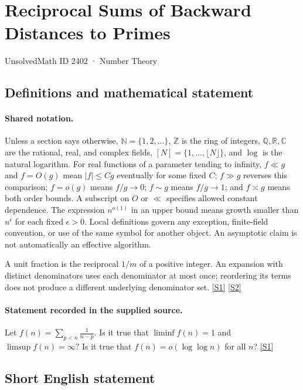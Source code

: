 \documentclass[11pt,a4paper]{article}
\newcommand{\N}{\mathbb{N}}
\newcommand{\Z}{\mathbb{Z}}
\newcommand{\Q}{\mathbb{Q}}
\newcommand{\R}{\mathbb{R}}
\newcommand{\C}{\mathbb{C}}
\newcommand{\sref}[2]{\hyperlink{source:#1:#2}{[S#2]}}
\begin{document}

\setcounter{section}{2401}

\section{Reciprocal Sums of Backward Distances to Primes}\label{2402}

{\small\sffamily UnsolvedMath ID 2402 · Number Theory}

\subsection{Definitions and mathematical statement}

\paragraph{Shared notation.}Unless a section says otherwise, $\N=\{1,2,\ldots\}$,
$\Z$ is the ring of integers, $\Q,\R,\C$ are the rational, real, and complex
fields, $[N]=\{1,\ldots,\lfloor N\rfloor\}$, and $\log$ is the natural
logarithm. For real functions of a parameter tending to infinity,
$f\ll g$ and $f=O(g)$ mean $|f|\leq Cg$ eventually for some fixed $C$;
$f\gg g$ reverses this comparison; $f=o(g)$ means $f/g\to0$;
$f\sim g$ means $f/g\to1$; and $f\asymp g$ means both order bounds.
A subscript on $O$ or $\ll$ specifies allowed constant dependence.
The expression $n^{o(1)}$ in an upper bound means growth smaller than
$n^\epsilon$ for each fixed $\epsilon>0$. Local definitions govern any
exception, finite-field convention, or use of the same symbol for another
object. An asymptotic claim is not automatically an effective algorithm.



A unit fraction is the reciprocal $1/m$ of a positive integer. An expansion with distinct denominators uses each denominator at most once; reordering its terms does not produce a different underlying denominator set. \sref{2402}{1} \sref{2402}{2}

\paragraph{Statement recorded in the supplied source.}
Let $ f(n) = \sum_{p<n}\frac{1}{n-p}. $ Is it true that $ \liminf f(n)=1 $ and $ \limsup f(n)=\infty? $ Is it true that $f(n)=o(\log\log n)$ for all $n$? \sref{2402}{1}

\subsection{Short English statement}
\end{document}

